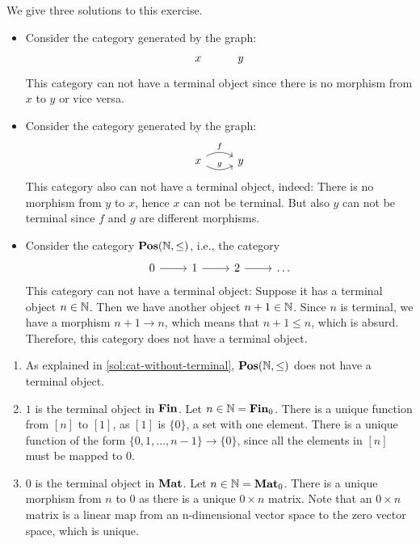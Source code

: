 \begin{solution}\label{sol:cat-without-terminal}
We give three solutions to this exercise.
\begin{itemize}
\item Consider the category generated by the graph: 
\[
\begin{tikzcd}
x & y
\end{tikzcd}
\]
This category can not have a terminal object since there is no morphism from $x$ to $y$ or vice versa.
\item Consider the category generated by the graph: 
\[
\begin{tikzcd}
x \arrow[r, bend left, "f"] \arrow[r, bend right, "g"] & y
\end{tikzcd}
\]
This category also can not have a terminal object, indeed: There is no morphism from $y$ to $x$, hence $x$ can not be terminal. But also $y$ can not be terminal since $f$ and $g$ are different morphisms.
\item Consider the category $ \mathbf{Pos}(\mathbb{N}, \leq) $, i.e., the category
\[
\begin{tikzcd}
	0 \arrow[r] & 1 \arrow[r] & 2 \arrow[r] & \dots
\end{tikzcd}
\]
This category can not have a terminal object: Suppose it has a terminal object $ n \in \mathbb{N} $. Then we have another object $ n + 1 \in \mathbb{N} $. Since $ n $ is terminal, we have a morphism $ n + 1 \to n $, which means that $ n + 1 \leq n $, which is absurd. Therefore, this category does not have a terminal object.
\end{itemize}
\end{solution}

\begin{solution}\label{sol:terminal_cats_of_nats}
	\begin{enumerate}
		\item As explained in \cref{sol:cat-without-terminal}, $\mathbf{Pos}(\mathbb{N},\leq)$ does not have a terminal object.
		\item $1$ is the terminal object in $\mathbf{Fin}$. Let $n \in \mathbb{N} = \mathbf{Fin}_0$. There is a unique function from $[n]$ to $[1]$, as $[1]$ is $\{0\}$, a set with one element. There is a unique function of the form $\{0, 1, \dots, n-1\} \to \{ 0 \}$, since all the elements in $[n]$ must be mapped to $0$.
		\item $0$ is the terminal object in $\mathbf{Mat}$. Let $n \in \mathbb{N} = \mathbf{Mat}_0$. There is a unique morphism from $n$ to $0$ as there is a unique $0 \times n$ matrix. 
		Note that an $0 \times n$ matrix is a linear map from an n-dimensional vector space to the zero vector space, which is unique.
	\end{enumerate}
	\end{solution}

